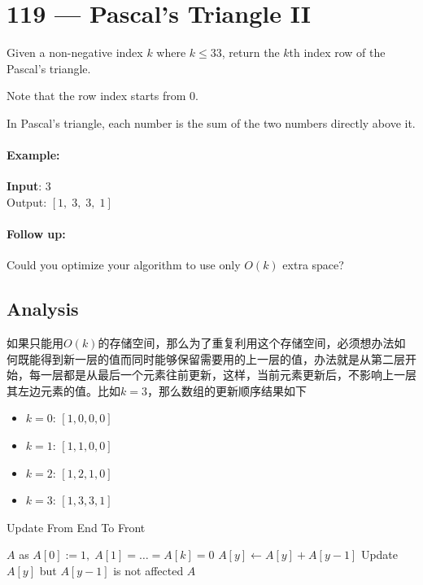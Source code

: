 \section{119 --- Pascal's Triangle II}
Given a non-negative index $k$ where $k \leq 33$, return the $k$th index row of the Pascal's triangle.
\par
Note that the row index starts from 0.
\par
In Pascal's triangle, each number is the sum of the two numbers directly above it.
\paragraph{Example:}
\begin{flushleft}
\textbf{Input}: 3
\\
Output: $[1,\;3,\;3,\;1]$
\end{flushleft}
\paragraph{Follow up:}
\begin{flushleft}
Could you optimize your algorithm to use only $O(k)$ extra space?
\end{flushleft}
\subsection{Analysis}
\begin{CJK*}{UTF8}{gbsn}
如果只能用$O(k)$的存储空间，那么为了重复利用这个存储空间，必须想办法如何既能得到新一层的值而同时能够保留需要用的上一层的值，办法就是从第二层开始，每一层都是从最后一个元素往前更新，这样，当前元素更新后，不影响上一层其左边元素的值。比如$k=3$，那么数组的更新顺序结果如下
\begin{itemize}
\item $k=0$: $[1,0,0,0]$
\item $k=1$: $[1,1,0,0]$
\item $k=2$: $[1,2,1,0]$
\item $k=3$: $[1,3,3,1]$
\end{itemize}
\end{CJK*}
\setcounter{algorithm}{0}
\begin{algorithm}[H]
\caption{Update From End To Front}
\begin{algorithmic}[1]
\State $A$ as $A[0]:=1,\;A[1]=\ldots=A[k]=0$
\State $A[y]\gets A[y] + A[y-1]$ \Comment Update $A[y]$ but $A[y-1]$ is not affected
\EndFor
\EndFor
\State \Return $A$
\EndProcedure
\end{algorithmic}
\end{algorithm}
